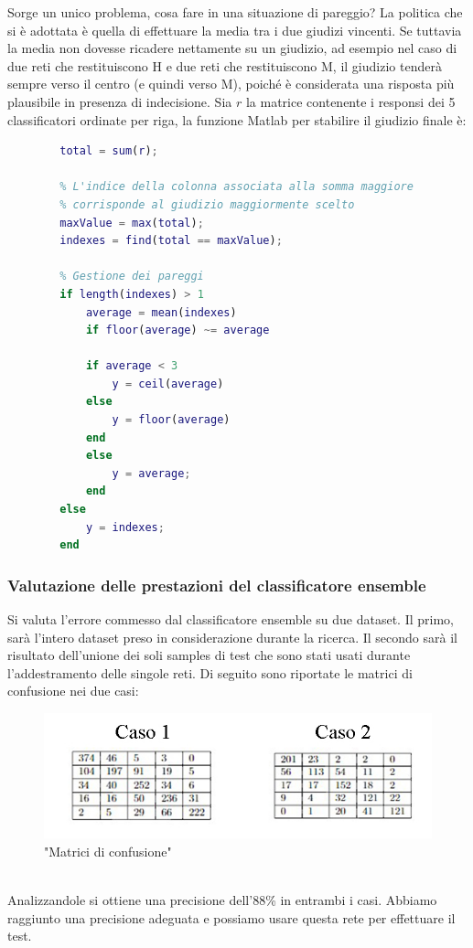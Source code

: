 \documentclass[a4paper,11pt]{article}
\begin{document}
    \newpage
    Sorge un unico problema, cosa fare in una situazione di pareggio? La politica che si è adottata è quella di effettuare la media tra i due giudizi vincenti.
    Se tuttavia la media non dovesse ricadere nettamente su un giudizio, ad esempio nel caso di due reti che restituiscono H e due reti che restituiscono M, il giudizio tenderà sempre
    verso il centro (e quindi verso M), poiché è considerata una risposta più plausibile in presenza di indecisione.
    Sia $r$ la matrice contenente i responsi dei 5 classificatori ordinate per riga, la funzione Matlab per stabilire il giudizio finale è:
    \begin{lstlisting}[language=Matlab]
        % Si calcola la somma per colonna 
        total = sum(r);

        % L'indice della colonna associata alla somma maggiore
        % corrisponde al giudizio maggiormente scelto
        maxValue = max(total);
        indexes = find(total == maxValue);

        % Gestione dei pareggi
        if length(indexes) > 1 
            average = mean(indexes)
            if floor(average) ~= average

            if average < 3
                y = ceil(average)
            else
                y = floor(average)
            end
            else 
                y = average;
            end
        else 
            y = indexes;
        end
    \end{lstlisting}
    \newpage
    \subsubsection{Valutazione delle prestazioni del classificatore ensemble}
    Si valuta l'errore commesso dal classificatore ensemble su due dataset. Il primo, sarà l'intero dataset preso in considerazione durante la ricerca.
    Il secondo sarà il risultato dell'unione dei soli samples di test che sono stati usati durante l'addestramento delle singole reti. 
    Di seguito sono riportate le matrici di confusione nei due casi:
    \begin{figure}[h]
        \centering
        \includegraphics{confusion3}
        \caption{"Matrici di confusione"}
    \end{figure}
    \\Analizzandole si ottiene una precisione dell'88\% in entrambi i casi. 
    Abbiamo raggiunto una precisione adeguata e possiamo usare questa rete per effettuare il test.
    \newpage
\end{document}
